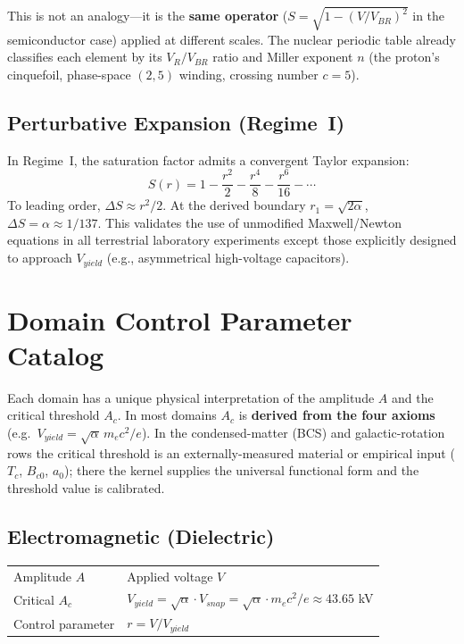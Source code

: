 \noindent This is not an analogy---it is the \textbf{same operator} ($S = \sqrt{1 - (V/V_{BR})^2}$ in the semiconductor case) applied at different scales. The nuclear periodic table already classifies each element by its $V_R/V_{BR}$ ratio and Miller exponent $n$ (the proton's cinquefoil, phase-space $(2,5)$ winding, crossing number $c = 5$).

\subsection{Perturbative Expansion (Regime~I)}

In Regime~I, the saturation factor admits a convergent Taylor expansion:
\begin{equation}
    S(r) = 1 - \frac{r^2}{2} - \frac{r^4}{8} - \frac{r^6}{16} - \cdots
    \label{eq:S_taylor}
\end{equation}
To leading order, $\Delta S \approx r^2/2$. At the derived boundary $r_1 = \sqrt{2\alpha}$, $\Delta S = \alpha \approx 1/137$. This validates the use of unmodified Maxwell/Newton equations in all terrestrial laboratory experiments except those explicitly designed to approach $V_{yield}$ (e.g., asymmetrical high-voltage capacitors).

\section{Domain Control Parameter Catalog}
\label{sec:domain_catalog}

Each domain has a unique physical interpretation of the amplitude $A$ and the critical threshold $A_c$. In most domains $A_c$ is \textbf{derived from the four axioms} (e.g.\ $V_{yield} = \sqrt{\alpha}\,m_e c^2/e$). In the condensed-matter (BCS) and galactic-rotation rows the critical threshold is an externally-measured material or empirical input ($T_c$, $B_{c0}$, $a_0$); there the kernel supplies the universal functional form and the threshold value is calibrated.

\subsection{Electromagnetic (Dielectric)}

\begin{center}
\begin{tabular}{ll}
\toprule
Amplitude $A$ & Applied voltage $V$ \\
Critical $A_c$ & $V_{yield} = \sqrt{\alpha} \cdot V_{snap} = \sqrt{\alpha} \cdot m_e c^2/e \approx 43.65$ kV \\
Control parameter & $r = V / V_{yield}$ \\
\bottomrule
\end{tabular}
\end{center}

